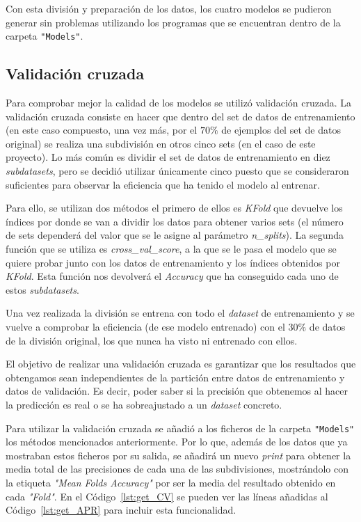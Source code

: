 \documentclass[a4paper, 12pt]{book}
\begin{document}
Con esta división y preparación de los datos, los cuatro modelos se pudieron generar sin problemas utilizando los programas que se encuentran dentro de la carpeta \texttt{"Models"}. 


\subsection{Validación cruzada}

Para comprobar mejor la calidad de los modelos se utilizó validación cruzada. La validación cruzada consiste en hacer que dentro del set de datos de entrenamiento (en este caso compuesto, una vez más, por el $70\%$ de ejemplos del set de datos original) se realiza una subdivisión en otros cinco sets (en el caso de este proyecto). Lo más común es dividir el set de datos de entrenamiento en diez \textit{subdatasets}, pero se decidió utilizar únicamente cinco puesto que se consideraron suficientes para observar la eficiencia que ha tenido el modelo al entrenar. 

Para ello, se utilizan dos métodos el primero de ellos es \textit{KFold} que devuelve los índices por donde se van a dividir los datos para obtener varios sets (el número de sets dependerá del valor que se le asigne al parámetro \textit{n\_splits}). La segunda función que se utiliza es \textit{cross\_val\_score}, a la que se le pasa el modelo que se quiere probar junto con los datos de entrenamiento y los índices obtenidos por \textit{KFold}. Esta función nos devolverá el \textit{Accuracy} que ha conseguido cada uno de estos \textit{subdatasets}.

Una vez realizada la división se entrena con todo el \textit{dataset} de entrenamiento y se vuelve a comprobar la eficiencia (de ese modelo entrenado) con el $30\%$ de datos de la división original, los que nunca ha visto ni entrenado con ellos.

El objetivo de realizar una validación cruzada es garantizar que los resultados que obtengamos sean independientes de la partición entre datos de entrenamiento y datos de validación. Es decir, poder saber si la precisión que obtenemos al hacer la predicción es real o se ha sobreajustado a un \textit{dataset} concreto.
 
 Para utilizar la validación cruzada se añadió a los ficheros de la carpeta \texttt{"Models"} los métodos mencionados anteriormente. Por lo que, además de los datos que ya mostraban estos ficheros por su salida, se añadirá un nuevo \textit{print} para obtener la media total de las precisiones de cada una de las subdivisiones, mostrándolo con la etiqueta \textit{"Mean Folds Accuracy"} por ser la media del resultado obtenido en cada \textit{"Fold"}. En el Código~\ref{lst:get_CV} se pueden ver las líneas añadidas al Código~\ref{lst:get_APR} para incluir esta funcionalidad.
 
\end{document}

